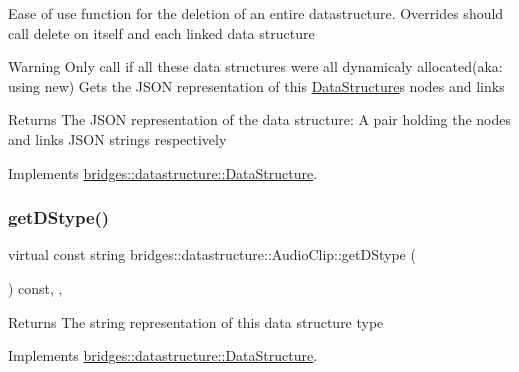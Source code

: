 Ease of use function for the deletion of an entire datastructure. Overrides should call delete on itself and each linked data structure

\begin{DoxyWarning}{Warning}
Only call if all these data structures were all dynamicaly allocated(aka\+: using new) Gets the J\+S\+ON representation of this \hyperlink{classbridges_1_1datastructure_1_1_data_structure}{Data\+Structure}\textquotesingle{}s nodes and links
\end{DoxyWarning}
\begin{DoxyReturn}{Returns}
The J\+S\+ON representation of the data structure\+: A pair holding the nodes and links J\+S\+ON strings respectively 
\end{DoxyReturn}


Implements \hyperlink{classbridges_1_1datastructure_1_1_data_structure}{bridges\+::datastructure\+::\+Data\+Structure}.

\mbox{\label{classbridges_1_1datastructure_1_1_audio_clip_a1fc853180a8d825b2e5ea2d8e3f8e810}} 
\subsubsection{\texorpdfstring{get\+D\+Stype()}{getDStype()}}
{\footnotesize\ttfamily virtual const string bridges\+::datastructure\+::\+Audio\+Clip\+::get\+D\+Stype (\begin{DoxyParamCaption}{ }\end{DoxyParamCaption}) const\hspace{0.3cm}{\ttfamily [inline]}, {\ttfamily [override]}, {\ttfamily [virtual]}}

\begin{DoxyReturn}{Returns}
The string representation of this data structure type 
\end{DoxyReturn}


Implements \hyperlink{classbridges_1_1datastructure_1_1_data_structure_a4ff66cb34409f11fe9fc647f6d8a22ce}{bridges\+::datastructure\+::\+Data\+Structure}.

\mbox{\label{classbridges_1_1datastructure_1_1_audio_clip_a8d685e4e2019e9167d55fc4df3d622d7}} 
